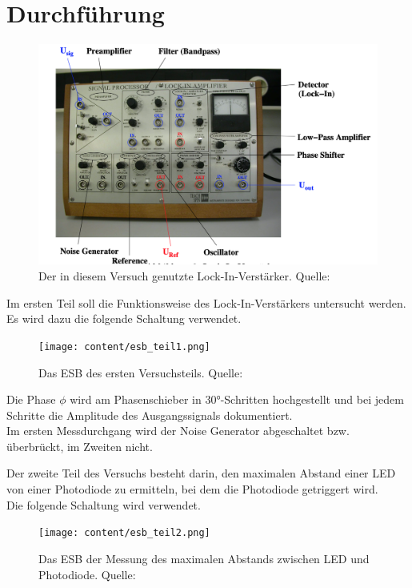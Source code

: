 \section{Durchführung}
\label{sec:Durchführung}

\begin{figure}[H]
    \centering
    \includegraphics[scale=0.5]{content/lock_in_gerät.png}
    \caption{Der in diesem Versuch genutzte Lock-In-Verstärker. Quelle:\cite{sample}}
    \label{fig:Prinzip_lock_in}
\end{figure}


Im ersten Teil soll die Funktionsweise des Lock-In-Verstärkers untersucht werden.\\

Es wird dazu die folgende Schaltung verwendet.

\begin{figure}[H]
    \centering
    \texttt{[image: content/esb\_teil1.png]}
    \caption{Das ESB des ersten Versuchsteils. Quelle:\cite{sample}}
    \label{fig:Prinzip_lock_in}
\end{figure}

Die Phase $\phi$ wird am Phasenschieber in 30°-Schritten hochgestellt und bei jedem Schritte
die Amplitude des Ausgangssignals dokumentiert.\\

Im ersten Messdurchgang wird der Noise Generator abgeschaltet bzw. überbrückt, im Zweiten nicht.

Der zweite Teil des Versuchs besteht darin, den maximalen Abstand
einer LED von einer Photodiode zu ermitteln, bei dem die Photodiode getriggert wird.\\
Die folgende Schaltung wird verwendet.

\begin{figure}[H]
    \centering
    \texttt{[image: content/esb\_teil2.png]}
    \caption{Das ESB der Messung des maximalen Abstands zwischen LED und Photodiode. Quelle:\cite{sample}}
    \label{fig:Prinzip_lock_in}
\end{figure}

